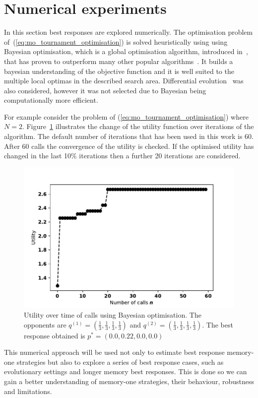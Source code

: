 \documentclass[10pt]{article}
\begin{document}
\section{Numerical experiments} \label{section:numerical_experiments}

In this section best responses are explored numerically. The optimisation
problem of~(\ref{eq:mo_tournament_optimisation}) is solved heuristically using
using Bayesian optimisation, which is a global optimisation algorithm,
introduced in~\cite{Mokus1978}, that has proven to outperform many other popular
algorithms~\cite{Jones2001}. It builds a bayesian understanding of the objective
function and it is well suited to the multiple local optimas in the described
search area. Differential evolution~\cite{Storn1997} was also considered,
however it was not selected due to Bayesian being computationally more
efficient.

For example consider the problem of (\ref{eq:mo_tournament_optimisation}) where
\(N=2\). Figure~\ref{bayesian_example} illustrates the change of the utility
function over iterations of the algorithm. The default number of iterations that
has been used in this work is 60. After 60 calls the convergence of the utility
is checked. If the optimised utility has changed in the last 10\% iterations
then a further 20 iterations are considered.

\begin{figure}[!htbp]
    \begin{center}
    \includegraphics[width=.5\linewidth]{img/bayesian_example.pdf}
    \end{center}
    \caption{Utility over time of calls using Bayesian optimisation. The
    opponents are \(q^{(1)} = (\frac{1}{3}, \frac{1}{3}, \frac{1}{3},
    \frac{1}{3})\) and \(q^{(2)} = (\frac{1}{3}, \frac{1}{3},
    \frac{1}{3}, \frac{1}{3})\). The best response obtained is \(p^* = (0.0, 0.22, 0.0, 0.0)\)}
    \label{bayesian_example}
\end{figure}

This numerical approach will be used not only to estimate best response
memory-one strategies but also to explore a series of best response cases, such
as evolutionary settings and longer memory best responses. This is done so we
can gain a better understanding of memory-one strategies, their behaviour,
robustness and limitations.
\end{document}
